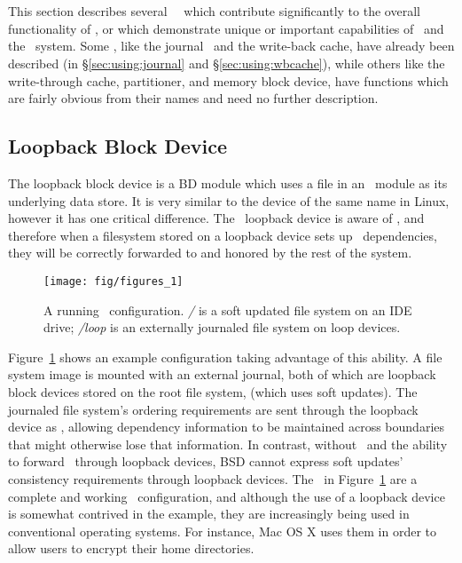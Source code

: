 \section{\Modules}
\label{sec:modules}

This section describes several \Kudos\ \modules\ which contribute significantly
to the overall functionality of \Kudos, or which demonstrate unique or important
capabilities of \chdescs\ and the \module\ system. Some \modules, like the
journal \module\ and the write-back cache, have already been described (in
\S\ref{sec:using:journal} and \S\ref{sec:using:wbcache}), while others like the
write-through cache, partitioner, and memory block device, have functions which
are fairly obvious from their names and need no further description.





\subsection{Loopback Block Device}
\label{sec:modules:loop}

The loopback block device is a BD module which uses a file in an \LFS\ module as
its underlying data store. It is very similar to the device of the same name in
Linux, however it has one critical difference. The \Kudos\ loopback device is
aware of \chdescs, and therefore when a filesystem stored on a loopback device
sets up \chdesc\ dependencies, they will be correctly forwarded to and honored
by the rest of the system.

\begin{figure}[htb]
  \centering
  \texttt{[image: fig/figures\_1]}
  \caption{A running \Kudos\ configuration. {\it/} is a soft updated
    file system on an IDE drive; {\it/loop} is an externally journaled
    file system on loop devices.}
  \label{fig:kfs-graph}
\end{figure}

Figure~\ref{fig:kfs-graph} shows an example configuration taking advantage of
this ability. A file system image is mounted with an external journal, both of
which are loopback block devices stored on the root file system, (which uses
soft updates). The journaled file system's ordering requirements are sent
through the loopback device as \chdescs, allowing dependency information to be
maintained across boundaries that might otherwise lose that information. In
contrast, without \chdescs\ and the ability to forward \chdescs\ through
loopback devices, BSD cannot express soft updates' consistency requirements
through loopback devices. The \modules\ in Figure~\ref{fig:kfs-graph} are a
complete and working \Kudos\ configuration, and although the use of a loopback
device is somewhat contrived in the example, they are increasingly being used in
conventional operating systems. For instance, Mac OS X uses them in order to
allow users to encrypt their home directories.

